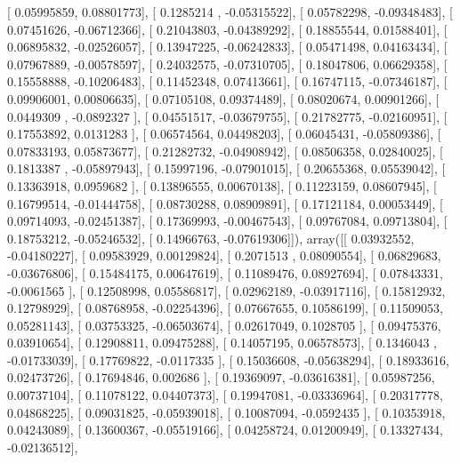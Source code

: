 \documentclass{article}
\begin{document}
       [ 0.05995859,  0.08801773],
       [ 0.1285214 , -0.05315522],
       [ 0.05782298, -0.09348483],
       [ 0.07451626, -0.06712366],
       [ 0.21043803, -0.04389292],
       [ 0.18855544,  0.01588401],
       [ 0.06895832, -0.02526057],
       [ 0.13947225, -0.06242833],
       [ 0.05471498,  0.04163434],
       [ 0.07967889, -0.00578597],
       [ 0.24032575, -0.07310705],
       [ 0.18047806,  0.06629358],
       [ 0.15558888, -0.10206483],
       [ 0.11452348,  0.07413661],
       [ 0.16747115, -0.07346187],
       [ 0.09906001,  0.00806635],
       [ 0.07105108,  0.09374489],
       [ 0.08020674,  0.00901266],
       [ 0.0449309 , -0.0892327 ],
       [ 0.04551517, -0.03679755],
       [ 0.21782775, -0.02160951],
       [ 0.17553892,  0.0131283 ],
       [ 0.06574564,  0.04498203],
       [ 0.06045431, -0.05809386],
       [ 0.07833193,  0.05873677],
       [ 0.21282732, -0.04908942],
       [ 0.08506358,  0.02840025],
       [ 0.1813387 , -0.05897943],
       [ 0.15997196, -0.07901015],
       [ 0.20655368,  0.05539042],
       [ 0.13363918,  0.0959682 ],
       [ 0.13896555,  0.00670138],
       [ 0.11223159,  0.08607945],
       [ 0.16799514, -0.01444758],
       [ 0.08730288,  0.08909891],
       [ 0.17121184,  0.00053449],
       [ 0.09714093, -0.02451387],
       [ 0.17369993, -0.00467543],
       [ 0.09767084,  0.09713804],
       [ 0.18753212, -0.05246532],
       [ 0.14966763, -0.07619306]]), array([[ 0.03932552, -0.04180227],
       [ 0.09583929,  0.00129824],
       [ 0.2071513 ,  0.08090554],
       [ 0.06829683, -0.03676806],
       [ 0.15484175,  0.00647619],
       [ 0.11089476,  0.08927694],
       [ 0.07843331, -0.0061565 ],
       [ 0.12508998,  0.05586817],
       [ 0.02962189, -0.03917116],
       [ 0.15812932,  0.12798929],
       [ 0.08768958, -0.02254396],
       [ 0.07667655,  0.10586199],
       [ 0.11509053,  0.05281143],
       [ 0.03753325, -0.06503674],
       [ 0.02617049,  0.1028705 ],
       [ 0.09475376,  0.03910654],
       [ 0.12908811,  0.09475288],
       [ 0.14057195,  0.06578573],
       [ 0.1346043 , -0.01733039],
       [ 0.17769822, -0.0117335 ],
       [ 0.15036608, -0.05638294],
       [ 0.18933616,  0.02473726],
       [ 0.17694846,  0.002686  ],
       [ 0.19369097, -0.03616381],
       [ 0.05987256,  0.00737104],
       [ 0.11078122,  0.04407373],
       [ 0.19947081, -0.03336964],
       [ 0.20317778,  0.04868225],
       [ 0.09031825, -0.05939018],
       [ 0.10087094, -0.0592435 ],
       [ 0.10353918,  0.04243089],
       [ 0.13600367, -0.05519166],
       [ 0.04258724,  0.01200949],
       [ 0.13327434, -0.02136512],
\end{document}
